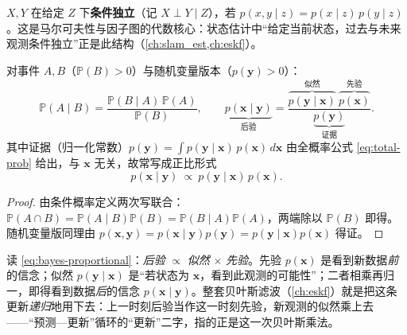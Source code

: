 \begin{definition}[条件独立]\label{def:cond-independence}
$X,Y$ 在给定 $Z$ 下\textbf{条件独立}（记 $X\perp Y\mid Z$），若 $p(x,y\mid z)=p(x\mid z)\,p(y\mid z)$。这是马尔可夫性与因子图的代数核心：状态估计中“给定当前状态，过去与未来观测条件独立”正是此结构（\cref{ch:slam_est,ch:eskf}）。
\end{definition}

\begin{theorem}[贝叶斯定理]\label{thm:bayes}
对事件 $A,B$（$\mathbb{P}(B)>0$）与随机变量版本（$p(\mathbf{y})>0$）：
\begin{equation}
  \mathbb{P}(A\mid B)=\frac{\mathbb{P}(B\mid A)\,\mathbb{P}(A)}{\mathbb{P}(B)},
  \qquad
  \underbrace{p(\mathbf{x}\mid\mathbf{y})}_{\text{后验}}=\frac{\overbrace{p(\mathbf{y}\mid\mathbf{x})}^{\text{似然}}\ \overbrace{p(\mathbf{x})}^{\text{先验}}}{\underbrace{p(\mathbf{y})}_{\text{证据}}}.
  \label{eq:prob-bayes}
\end{equation}
其中证据（归一化常数）$p(\mathbf{y})=\int p(\mathbf{y}\mid\mathbf{x})\,p(\mathbf{x})\,d\mathbf{x}$ 由全概率公式 \cref{eq:total-prob} 给出，与 $\mathbf{x}$ 无关，故常写成正比形式
\begin{equation}
  p(\mathbf{x}\mid\mathbf{y})\ \propto\ p(\mathbf{y}\mid\mathbf{x})\,p(\mathbf{x}).
  \label{eq:bayes-proportional}
\end{equation}
\end{theorem}
\begin{proof}
由条件概率定义两次写联合：$\mathbb{P}(A\cap B)=\mathbb{P}(A\mid B)\mathbb{P}(B)=\mathbb{P}(B\mid A)\mathbb{P}(A)$，两端除以 $\mathbb{P}(B)$ 即得。随机变量版同理由 $p(\mathbf{x},\mathbf{y})=p(\mathbf{x}\mid\mathbf{y})p(\mathbf{y})=p(\mathbf{y}\mid\mathbf{x})p(\mathbf{x})$ 得证。
\end{proof}

\begin{insight}
读 \cref{eq:bayes-proportional}：\emph{后验} $\propto$ \emph{似然} $\times$ \emph{先验}。先验 $p(\mathbf{x})$ 是看到新数据\emph{前}的信念；似然 $p(\mathbf{y}\mid\mathbf{x})$ 是“若状态为 $\mathbf{x}$，看到此观测的可能性”；二者相乘再归一，即得看到数据\emph{后}的信念 $p(\mathbf{x}\mid\mathbf{y})$。整套贝叶斯滤波（\cref{ch:eskf}）就是把这条更新\emph{递归}地用下去：上一时刻后验当作这一时刻先验，新观测的似然乘上去——“预测—更新”循环的“更新”二字，指的正是这一次贝叶斯乘法。
\end{insight}

